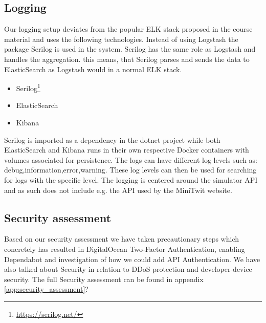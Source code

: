 \subsection{Logging}
Our logging setup deviates from the popular ELK stack proposed in the course material and uses the following technologies. Instead of using Logstash the package Serilog is used in the system. Serilog has the same role as Logstash and handles the aggregation. this means, that Serilog parses and sends the data to ElasticSearch as Logstash would in a normal ELK stack.
\begin{itemize}
    \item Serilog\footnote{\url{https://serilog.net/}}
    \item ElasticSearch
    \item Kibana 
\end{itemize}
Serilog is imported as a dependency in the dotnet project while both ElasticSearch and Kibana runs in their own respective Docker containers with volumes associated for persistence. The logs can have different log levels such as: debug,information,error,warning. These log levels can then be used for searching for logs with the specific level.
The logging is centered around the simulator API and as such does not include e.g. the API used by the MiniTwit website.\\ 





\subsection{Security assessment}
Based on our security assessment we have taken precautionary steps which concretely has resulted in DigitalOcean Two-Factor Authentication, enabling Dependabot and investigation of how we could add API Authentication. We have also talked about Security in relation to DDoS protection and developer-device security. The full Security assessment can be found in appendix \ref{app:security_assessment}?

